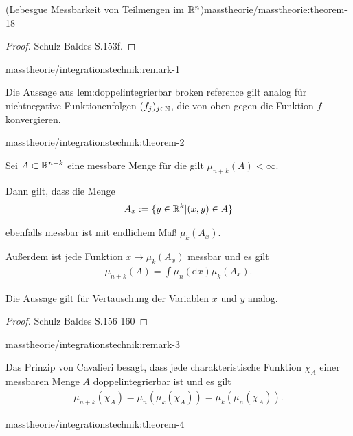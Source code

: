 \begin{theorem}{(Lebesgue Messbarkeit von Teilmengen im \protect\(\mathbb{R}^n\protect\))}{masstheorie/masstheorie:theorem-18}
\begin{proof}
 Schulz Baldes S.153f.
\end{proof}
\begin{remark}{}{masstheorie/integrationstechnik:remark-1}



\par
Die Aussage aus {lem:doppelintegrierbar broken reference} gilt analog für nichtnegative Funktionenfolgen \((f_j)_{j\in\mathbb{N}}\), die von oben gegen die Funktion \(f\) konvergieren.
\end{remark}
\begin{theorem}{}{masstheorie/integrationstechnik:theorem-2}



\par
Sei \(A \subset \mathbb{R}^{n+k}\) eine messbare Menge für die gilt \(\mu_{n+k}(A) < \infty\).

\par
Dann gilt, dass die Menge
\begin{align*}
A_x := \lbrace y \in \mathbb{R}^k | (x,y) \in A \rbrace
\end{align*}
\par
ebenfalls messbar ist mit endlichem Maß \(\mu_k(A_x)\).

\par
Außerdem ist jede Funktion \(x \mapsto \mu_k(A_x)\) messbar und es gilt
\begin{align*}
\mu_{n+k}(A) = \int \mu_n(\mathrm{d}x) \mu_k(A_x).
\end{align*}
\par
Die Aussage gilt für Vertauschung der Variablen \(x\) und \(y\) analog.
\end{theorem}

\begin{proof}
 Schulz Baldes S.156 160
\end{proof}
\begin{remark}{}{masstheorie/integrationstechnik:remark-3}



\par
Das Prinzip von Cavalieri besagt, dass jede charakteristische Funktion \(\chi_A\) einer messbaren Menge \(A\) doppelintegrierbar ist und es gilt
\begin{align*}
\mu_{n+k}(\chi_A) = \mu_n(\mu_k(\chi_A)) = \mu_k(\mu_n(\chi_A)).\end{align*}\end{remark}
\begin{theorem}{}{masstheorie/integrationstechnik:theorem-4}




\end{theorem}
\end{theorem}
